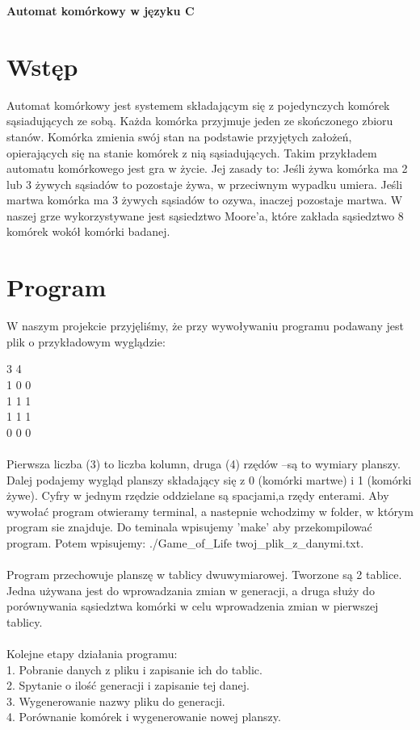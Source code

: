 \documentclass[11pt]{article}
\begin{document}
\begin{huge}
\begin{center}
\textbf{Automat kom\'orkowy w j\k{e}zyku C}\\
\end{center}
\end{huge}

\section{Wst\k{e}p}
Automat komórkowy jest systemem składającym się z pojedynczych komórek sąsiadujących ze sobą. Każda komórka przyjmuje jeden ze skończonego zbioru stanów. Komórka zmienia swój stan na podstawie przyjętych założeń, opierających się na stanie komórek z nią sąsiadujących. Takim przykładem automatu komórkowego jest gra w życie. Jej zasady to:
Jeśli żywa komórka ma 2 lub 3 żywych sąsiadów to pozostaje żywa, w przeciwnym wypadku umiera. Jeśli martwa komórka ma 3 żywych sąsiadów to ozywa, inaczej pozostaje martwa.
W naszej grze wykorzystywane jest sąsiedztwo Moore’a, które zakłada sąsiedztwo 8 komórek wokół komórki badanej.


\section{Program}

W naszym projekcie przyjęliśmy, że przy wywoływaniu programu podawany jest plik o przykładowym wyglądzie:

3 4\\
1 0 0\\
1 1 1\\
1 1 1\\
0 0 0\\
\\
Pierwsza liczba (3) to liczba kolumn, druga (4) rzędów –są to wymiary planszy. Dalej podajemy wygląd planszy składający się z 0 (komórki martwe) i 1 (komórki żywe). Cyfry w jednym rzędzie oddzielane są spacjami,a rzędy enterami. Aby wywołać program otwieramy terminal, a nastepnie wchodzimy w folder, w którym program sie znajduje. Do teminala wpisujemy 'make' aby przekompilować program. Potem wpisujemy: ./Game_of_Life twoj_plik_z_danymi.txt. 
\\
\\
Program przechowuje planszę w tablicy dwuwymiarowej. Tworzone są 2 tablice. Jedna używana jest do wprowadzania zmian w generacji, a druga służy do porównywania sąsiedztwa komórki w celu wprowadzenia zmian w pierwszej tablicy.
\\
\\
Kolejne etapy działania programu:\\
1.	Pobranie danych z pliku i zapisanie ich do tablic.\\
2.	Spytanie o ilość generacji i zapisanie tej danej.\\
3.	Wygenerowanie nazwy pliku do generacji.\\
4.	Porównanie komórek i wygenerowanie nowej planszy.
\end{document}
